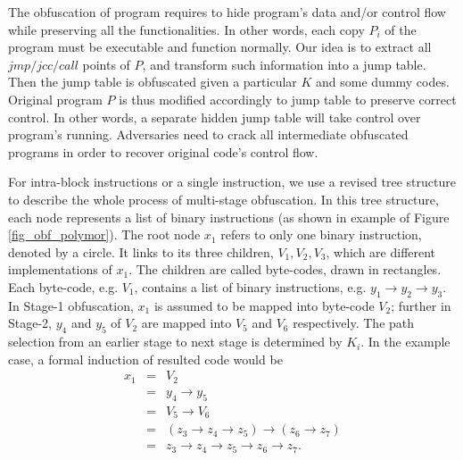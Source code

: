 \documentclass{../style/llncs}                   %
\begin{document}
The obfuscation of program requires to hide program's data and/or control flow while
preserving all the functionalities. In other words, each copy $P_i$ of the program must
be executable and function normally. Our idea is to extract all $jmp/jcc/call$ points
of $P$, and transform such information into a jump table. Then the jump table is obfuscated
given a particular $K$ and some dummy codes.
Original program $P$ is thus modified accordingly to
jump table to preserve correct control.
In other words, a separate hidden jump table will take control over program's running.
Adversaries need to crack all intermediate obfuscated programs in order to recover original
code's control flow.






For intra-block instructions or a single instruction,
we use a revised tree structure to describe the whole process of multi-stage obfuscation.
In this tree structure,
each node represents a list of binary instructions (as shown in example of Figure \ref{fig_obf_polymor}).
The root node $x_1$ refers to only one binary instruction,
denoted by a circle. It links to its three children, $V_1, V_2, V_3$, which are different
implementations of $x_1$. The children are called byte-codes, drawn in rectangles.
Each byte-code, e.g. $V_1$, contains
a list of binary instructions, e.g. $y_1 \rightarrow y_2 \rightarrow y_3$.
In Stage-1 obfuscation, $x_1$ is assumed to be
mapped into byte-code $V_2$; further in Stage-2, $y_4$ and $y_5$ of $V_2$
are mapped into $V_5$ and
$V_6$ respectively.
The path selection from an earlier stage to next stage is determined by
$K_i$. In the example case, a formal induction of resulted code would be
\begin{eqnarray*}
x_1 &=& V_2  \\
    &=& y_4 \rightarrow y_5  \\
    &=& V_5 \rightarrow V_6  \\
    &=& (z_3 \rightarrow z_4 \rightarrow z_5) \rightarrow (z_6 \rightarrow z_7) \\
    &=& z_3 \rightarrow z_4 \rightarrow z_5 \rightarrow z_6 \rightarrow z_7.
\end{eqnarray*}
\end{document}
